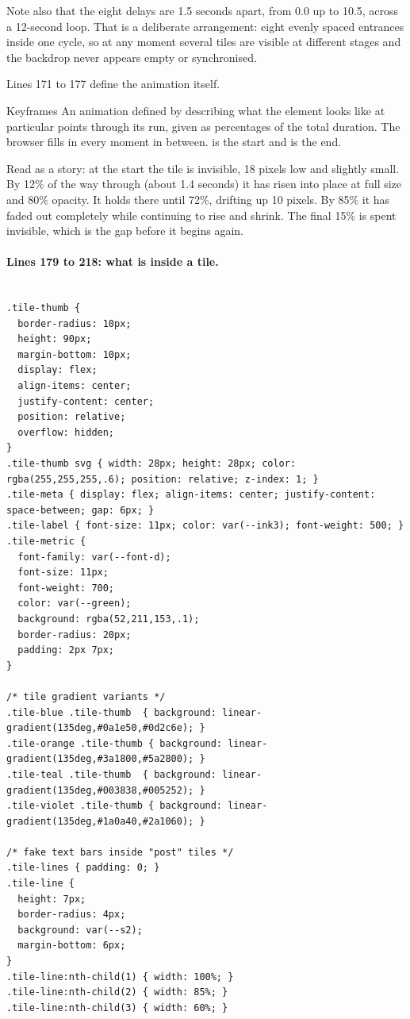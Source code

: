 Note also that the eight delays are 1.5 seconds apart, from 0.0 up to 10.5, across
a 12-second loop. That is a deliberate arrangement: eight evenly spaced entrances
inside one cycle, so at any moment several tiles are visible at different stages
and the backdrop never appears empty or synchronised.

Lines 171 to 177 define the animation itself.

\begin{jargon}{Keyframes}
An animation defined by describing what the element looks like at particular
points through its run, given as percentages of the total duration. The browser
fills in every moment in between.  is the start and  is the
end.
\end{jargon}

Read as a story: at the start the tile is invisible, 18 pixels low and slightly
small. By 12\% of the way through (about 1.4 seconds) it has risen into place at
full size and 80\% opacity. It holds there until 72\%, drifting up 10 pixels. By
85\% it has faded out completely while continuing to rise and shrink. The final
15\% is spent invisible, which is the gap before it begins again.

\paragraph{Lines 179 to 218: what is inside a tile.}

\begin{lstlisting}[firstnumber=178,caption={\file{css/site.css}, lines 178--218}]

.tile-thumb {
  border-radius: 10px;
  height: 90px;
  margin-bottom: 10px;
  display: flex;
  align-items: center;
  justify-content: center;
  position: relative;
  overflow: hidden;
}
.tile-thumb svg { width: 28px; height: 28px; color: rgba(255,255,255,.6); position: relative; z-index: 1; }
.tile-meta { display: flex; align-items: center; justify-content: space-between; gap: 6px; }
.tile-label { font-size: 11px; color: var(--ink3); font-weight: 500; }
.tile-metric {
  font-family: var(--font-d);
  font-size: 11px;
  font-weight: 700;
  color: var(--green);
  background: rgba(52,211,153,.1);
  border-radius: 20px;
  padding: 2px 7px;
}

/* tile gradient variants */
.tile-blue .tile-thumb  { background: linear-gradient(135deg,#0a1e50,#0d2c6e); }
.tile-orange .tile-thumb { background: linear-gradient(135deg,#3a1800,#5a2800); }
.tile-teal .tile-thumb  { background: linear-gradient(135deg,#003838,#005252); }
.tile-violet .tile-thumb { background: linear-gradient(135deg,#1a0a40,#2a1060); }

/* fake text bars inside "post" tiles */
.tile-lines { padding: 0; }
.tile-line {
  height: 7px;
  border-radius: 4px;
  background: var(--s2);
  margin-bottom: 6px;
}
.tile-line:nth-child(1) { width: 100%; }
.tile-line:nth-child(2) { width: 85%; }
.tile-line:nth-child(3) { width: 60%; }
\end{lstlisting}

